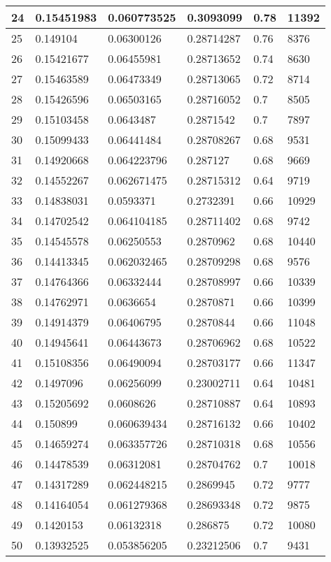\begin{longtable}{|l|l|l|l|l|l|}
24 & 0.15451983 & 0.060773525 & 0.3093099 & 0.78 & 11392 \\ \hline 
25 & 0.149104 & 0.06300126 & 0.28714287 & 0.76 & 8376 \\ \hline 
26 & 0.15421677 & 0.06455981 & 0.28713652 & 0.74 & 8630 \\ \hline 
27 & 0.15463589 & 0.06473349 & 0.28713065 & 0.72 & 8714 \\ \hline 
28 & 0.15426596 & 0.06503165 & 0.28716052 & 0.7 & 8505 \\ \hline 
29 & 0.15103458 & 0.0643487 & 0.2871542 & 0.7 & 7897 \\ \hline 
30 & 0.15099433 & 0.06441484 & 0.28708267 & 0.68 & 9531 \\ \hline 
31 & 0.14920668 & 0.064223796 & 0.287127 & 0.68 & 9669 \\ \hline 
32 & 0.14552267 & 0.062671475 & 0.28715312 & 0.64 & 9719 \\ \hline 
33 & 0.14838031 & 0.0593371 & 0.2732391 & 0.66 & 10929 \\ \hline 
34 & 0.14702542 & 0.064104185 & 0.28711402 & 0.68 & 9742 \\ \hline 
35 & 0.14545578 & 0.06250553 & 0.2870962 & 0.68 & 10440 \\ \hline 
36 & 0.14413345 & 0.062032465 & 0.28709298 & 0.68 & 9576 \\ \hline 
37 & 0.14764366 & 0.06332444 & 0.28708997 & 0.66 & 10339 \\ \hline 
38 & 0.14762971 & 0.0636654 & 0.2870871 & 0.66 & 10399 \\ \hline 
39 & 0.14914379 & 0.06406795 & 0.2870844 & 0.66 & 11048 \\ \hline 
40 & 0.14945641 & 0.06443673 & 0.28706962 & 0.68 & 10522 \\ \hline 
41 & 0.15108356 & 0.06490094 & 0.28703177 & 0.66 & 11347 \\ \hline 
42 & 0.1497096 & 0.06256099 & 0.23002711 & 0.64 & 10481 \\ \hline 
43 & 0.15205692 & 0.0608626 & 0.28710887 & 0.64 & 10893 \\ \hline 
44 & 0.150899 & 0.060639434 & 0.28716132 & 0.66 & 10402 \\ \hline 
45 & 0.14659274 & 0.063357726 & 0.28710318 & 0.68 & 10556 \\ \hline 
46 & 0.14478539 & 0.06312081 & 0.28704762 & 0.7 & 10018 \\ \hline 
47 & 0.14317289 & 0.062448215 & 0.2869945 & 0.72 & 9777 \\ \hline 
48 & 0.14164054 & 0.061279368 & 0.28693348 & 0.72 & 9875 \\ \hline 
49 & 0.1420153 & 0.06132318 & 0.286875 & 0.72 & 10080 \\ \hline 
50 & 0.13932525 & 0.053856205 & 0.23212506 & 0.7 & 9431 \\ \hline 
\end{longtable}